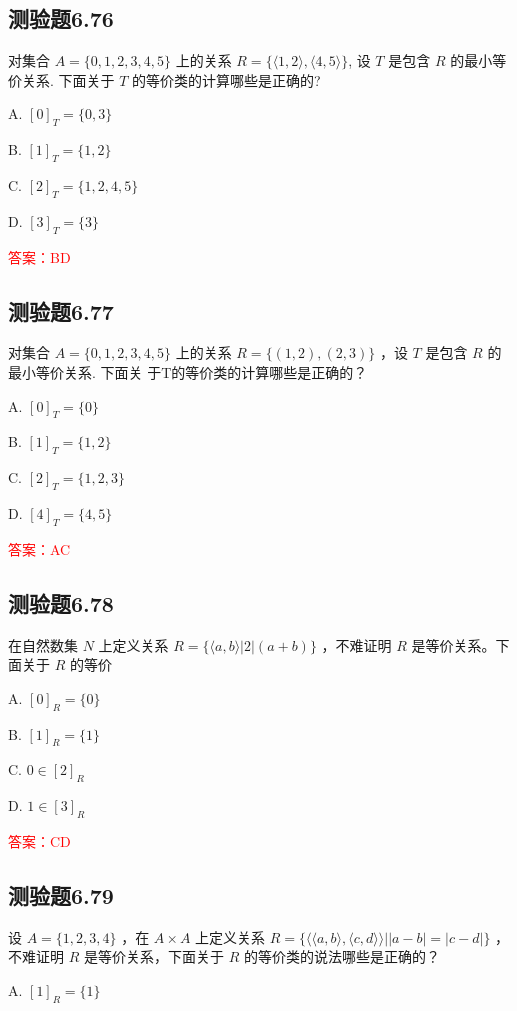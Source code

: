 \documentclass[UTF8, heading=true]{ctexart}
\begin{document}
\subsection{测验题6.76}

对集合 $A=\{0,1,2,3,4,5\}$ 上的关系 $R=\{\langle 1,2\rangle,\langle 4,5\rangle \}$, 设 $T$ 是包含 $R$ 的最小等价关系. 下面关于 $T$ 的等价类的计算哪些是正确的?

A. $[0]_T=\{0,3\}$

B. $[1]_T=\{1,2\}$

C. $[2]_T=\{1,2,4,5\}$

D. $[3]_T=\{3\}$

\textcolor{red}{答案：BD}

\subsection{测验题6.77}

对集合 $A=\{0,1,2,3,4,5\}$ 上的关系 $R=\{(1,2),(2,3)\}$ ，设 $T$ 是包含 $R$ 的最小等价关系. 下面关
于T的等价类的计算哪些是正确的？

A. $[0]_T=\{0\}$

B. $[1]_T=\{1,2\}$


C. $[2]_T=\{1,2,3\}$

D. $[4]_T=\{4,5\}$


\textcolor{red}{答案：AC}

\subsection{测验题6.78}

在自然数集 $N$ 上定义关系 $R=\{\langle a, b\rangle|2|(a+b)\}$ ，不难证明 $R$ 是等价关系。下面关于 $R$ 的等价

A. $[0]_R=\{0\}$

B. $[1]_R=\{1\}$

C. $0 \in[2]_R$

D. $1 \in[3]_R$

\textcolor{red}{答案：CD}

\subsection{测验题6.79}

设 $A=\{1,2,3,4\}$ ，在 $A \times A$ 上定义关系 $R=\{\langle\langle a, b\rangle,\langle c, d\rangle\rangle| | a-b|=|c-d|\}$ ，不难证明 $R$ 是等价关系，下面关于 $R$ 的等价类的说法哪些是正确的？

A. $[1]_R=\{1\}$
\end{document}
